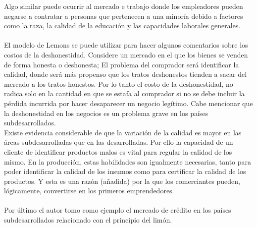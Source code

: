 \begin{multicols}{2}
 Algo similar puede ocurrir al mercado e trabajo donde los empleadores pueden negarse a contratar a personas que pertenecen a una minoría debido a factores como la raza, la calidad de la educación y las capacidades laborales generales.\\\\
El modelo de Lemons se puede utilizar para hacer algunos comentarios sobre los costos de la deshonestidad. Considere un mercado en el que los bienes se venden de forma honesta o deshonesta; El problema del comprador será identificar la calidad, donde será más propenso  que los tratos deshonestos tienden a sacar del mercado a los tratos honestos. Por lo tanto  el costo de la deshonestidad, no radica solo en la cantidad en que se estafa al comprador si no se debe incluir la pérdida incurrida por hacer desaparecer un negocio legítimo. Cabe mencionar que la deshonestidad en los negocios es un problema grave en los países subdesarrollados.\\ 
Existe evidencia considerable de que la variación de la calidad es mayor en las áreas subdesarrolladas que en las desarrolladas. Por ello la capacidad de un cliente de identificar productos malos es vital para regular la calidad de los mismo. En la producción, estas habilidades son igualmente necesarias, tanto para poder identificar la calidad de los insumos como para certificar la calidad de los productos. Y esta es una razón (añadida) por la que los comerciantes pueden, lógicamente, convertirse en los primeros emprendedores. \\\\
Por último el autor tomo como ejemplo el mercado de crédito en los países subdesarrollados relacionado con el principio del limón.  


 \end{multicols}
